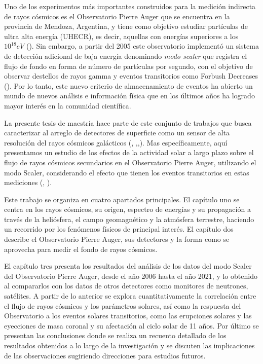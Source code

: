 Uno de los experimentos más importantes construidos para la medición indirecta de rayos cósmicos es el Observatorio Pierre Auger que se encuentra en la provincia de Mendoza, Argentina, y tiene como objetivo estudiar partículas de ultra alta energía (UHECR), es decir, aquellas con energías superiores a los $10^{18}eV$ (\cite{AugerGENERAL_2015}). Sin embargo, a partir del 2005 este observatorio implementó un sistema de detección adicional de baja energía denominado \textit{modo scaler} que registra el flujo de fondo en forma de número de partículas por segundo, con el objetivo de observar destellos de rayos gamma y eventos transitorios como Forbush Decreases (\cite{DASSO20121563}). Por lo tanto, este nuevo criterio de almacenamiento de eventos ha abierto un mundo de nuevos análisis e información física que en los últimos años ha logrado mayor interés en la comunidad científica.

La presente tesis de maestría hace parte de este conjunto de trabajos que busca caracterizar al arreglo de detectores de superficie como un sensor de alta resolución del rayos cósmicos galácticos (\cite{DASSO20121563}, \cite{asorey},\cite{masias_2017},\cite{Martin_Schimassek2022}). Mas específicamente, aquí presentamos un estudio de los efectos de la actividad solar a largo plazo sobre el flujo de rayos cósmicos secundarios en el Observatorio Pierre Auger, utilizando el modo Scaler, considerando el efecto que tienen los eventos transitorios en estas mediciones (\cite{roberta_2018}, \cite{Martin_Schimassek2022}). 


Este trabajo se organiza en cuatro apartados principales. El capítulo uno se centra en los rayos cósmicos, su origen, espectro de energías y su propagación a través de la heliósfera, el campo geomagnético y la atmósfera terrestre, haciendo un recorrido por los fenómenos físicos de principal interés. El capítulo dos describe el Observatorio Pierre Auger, sus detectores y la forma como se aprovecha para medir el fondo de rayos cósmicos.

El capítulo tres presenta los resultados del análisis de los datos del modo Scaler del Observatorio Pierre Auger, desde el año 2006 hasta el año 2021, y lo obtenido al compararlos con los datos de otros detectores como monitores de neutrones, satélites. A partir de lo anterior se explora cuantitativamente la correlación entre el flujo de rayos cósmicos y los parámetros solares, así como la respuesta del Observatorio a los eventos solares transitorios, como las erupciones solares y las eyecciones de masa coronal y su afectación al ciclo solar de 11 años. Por último se presentan las conclusiones donde se realiza un recuento detallado de los resultados obtenidos a lo largo de la investigación y se discuten las implicaciones de las observaciones sugiriendo direcciones para estudios futuros.

  

